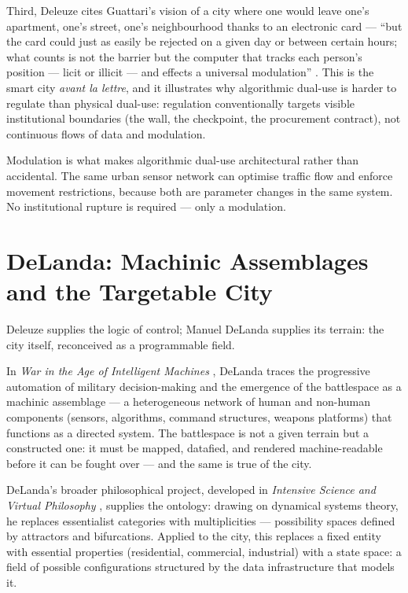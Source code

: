 \documentclass[12pt,a4paper,twoside]{report}
\begin{document}
Third, Deleuze cites Guattari's vision of a city where one would leave one's apartment, one's street, one's neighbourhood thanks to an electronic card — ``but the card could just as easily be rejected on a given day or between certain hours; what counts is not the barrier but the computer that tracks each person's position — licit or illicit — and effects a universal modulation'' \parencite[p.~7]{deleuze1990}. This is the smart city \textit{avant la lettre}, and it illustrates why algorithmic dual-use is harder to regulate than physical dual-use: regulation conventionally targets visible institutional boundaries (the wall, the checkpoint, the procurement contract), not continuous flows of data and modulation.

Modulation is what makes algorithmic dual-use architectural rather than accidental. The same urban sensor network can optimise traffic flow and enforce movement restrictions, because both are parameter changes in the same system. No institutional rupture is required — only a modulation.

\section{DeLanda: Machinic Assemblages and the Targetable City}
\label{sec:delanda}

Deleuze supplies the logic of control; Manuel DeLanda supplies its terrain: the city itself, reconceived as a programmable field.

In \textit{War in the Age of Intelligent Machines} \parencite{delanda1992}, DeLanda traces the progressive automation of military decision-making and the emergence of the battlespace as a machinic assemblage — a heterogeneous network of human and non-human components (sensors, algorithms, command structures, weapons platforms) that functions as a directed system. The battlespace is not a given terrain but a constructed one: it must be mapped, datafied, and rendered machine-readable before it can be fought over — and the same is true of the city.

DeLanda's broader philosophical project, developed in \textit{Intensive Science and Virtual Philosophy} \citeyearpar{delanda2014}, supplies the ontology: drawing on dynamical systems theory, he replaces essentialist categories with multiplicities — possibility spaces defined by attractors and bifurcations. Applied to the city, this replaces a fixed entity with essential properties (residential, commercial, industrial) with a state space: a field of possible configurations structured by the data infrastructure that models it.
\end{document}
